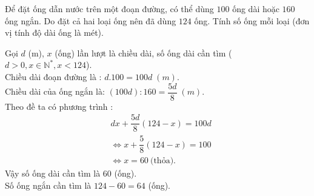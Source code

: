 	\begin{ex}%
		Để đặt ống dẫn nước trên một đoạn đường, có thể dùng $100$ ống dài hoặc $160$ ống ngắn. Do 
		đặt cả hai loại ống nên đã dùng $124$ ống. Tính số ống mỗi loại (đơn vị tính độ dài ống là mét).
		
		\loigiai
		{
			Gọi $d$ (m), $x$ (ống) lần lượt là chiều dài, số ống dài cần tìm ($d > 0,x \in \mathbb{N}^*, x < 124$).\\
			Chiều dài đoạn đường là : $d.100 = 100d\;(m).$\\
			Chiều dài của ống ngắn là: $(100d) : 160 =\dfrac{5d}{8}\;(m).$   \\
			Theo đề ta có phương trình : 
			\begin{align*}
				&dx + \dfrac{5d}{8}(124-x) = 100d\\
				&\Leftrightarrow x +  \dfrac{5}{8}(124-x)= 100\\
				&\Leftrightarrow  x = 60~\text {(thỏa).}
			\end{align*}
			Vậy số ống dài cần tìm là $60$ (ống).\\
			Số ống ngắn cần tìm là $124-60=64$ (ống).
		}
	\end{ex}
